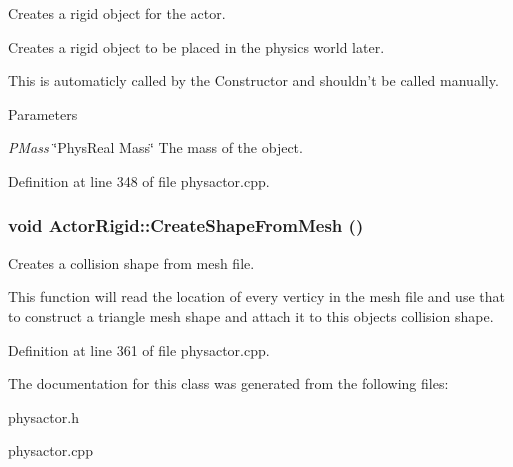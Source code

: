 Creates a rigid object for the actor. 

Creates a rigid object to be placed in the physics world later. \par
 This is automaticly called by the Constructor and shouldn't be called manually. 
\begin{DoxyParams}{Parameters}
\item[{\em PMass}]\char`\"{}PhysReal Mass\char`\"{} The mass of the object. \end{DoxyParams}


Definition at line 348 of file physactor.cpp.

\hypertarget{classActorRigid_a1a1b7ca97c69bb5420a76116c388b3d1}{
\subsubsection[{CreateShapeFromMesh}]{\setlength{\rightskip}{0pt plus 5cm}void ActorRigid::CreateShapeFromMesh ()}}
\label{d5/d10/classActorRigid_a1a1b7ca97c69bb5420a76116c388b3d1}


Creates a collision shape from mesh file. 

This function will read the location of every verticy in the mesh file and use that to construct a triangle mesh shape and attach it to this objects collision shape. 

Definition at line 361 of file physactor.cpp.



The documentation for this class was generated from the following files:\begin{DoxyCompactItemize}
\item 
physactor.h\item 
physactor.cpp\end{DoxyCompactItemize}
